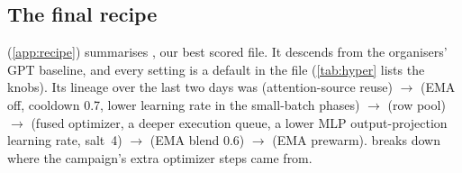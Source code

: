 \subsection{The final recipe}
\label{sec:recipe}

 (\cref{app:recipe}) summarises , our best scored file. It descends from the organisers' GPT baseline, and
every setting is a default in the file (\cref{tab:hyper} lists the knobs). Its lineage over the last two days was
 (attention-source reuse) $\to$  (EMA off, cooldown 0.7, lower learning rate in the small-batch
phases) $\to$  (row pool) $\to$  (fused optimizer, a deeper execution queue, a lower MLP
output-projection learning rate, salt~4) $\to$  (EMA blend 0.6) $\to$  (EMA prewarm).  breaks down where
the campaign's extra optimizer steps came from.
